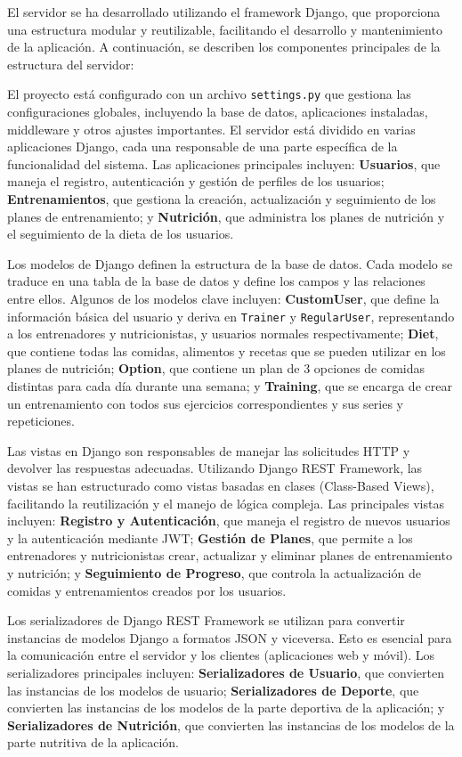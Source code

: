 El servidor se ha desarrollado utilizando el framework Django, que proporciona una estructura modular y reutilizable, facilitando el desarrollo y mantenimiento de la aplicación. A continuación, se describen los componentes principales de la estructura del servidor:

El proyecto está configurado con un archivo \texttt{settings.py} que gestiona las configuraciones globales, incluyendo la base de datos, aplicaciones instaladas, middleware y otros ajustes importantes. El servidor está dividido en varias aplicaciones Django, cada una responsable de una parte específica de la funcionalidad del sistema. Las aplicaciones principales incluyen: \textbf{Usuarios}, que maneja el registro, autenticación y gestión de perfiles de los usuarios; \textbf{Entrenamientos}, que gestiona la creación, actualización y seguimiento de los planes de entrenamiento; y \textbf{Nutrición}, que administra los planes de nutrición y el seguimiento de la dieta de los usuarios.

Los modelos de Django definen la estructura de la base de datos. Cada modelo se traduce en una tabla de la base de datos y define los campos y las relaciones entre ellos. Algunos de los modelos clave incluyen: \textbf{CustomUser}, que define la información básica del usuario y deriva en \texttt{Trainer} y \texttt{RegularUser}, representando a los entrenadores y nutricionistas, y usuarios normales respectivamente; \textbf{Diet}, que contiene todas las comidas, alimentos y recetas que se pueden utilizar en los planes de nutrición; \textbf{Option}, que contiene un plan de 3 opciones de comidas distintas para cada día durante una semana; y \textbf{Training}, que se encarga de crear un entrenamiento con todos sus ejercicios correspondientes y sus series y repeticiones.

Las vistas en Django son responsables de manejar las solicitudes HTTP y devolver las respuestas adecuadas. Utilizando Django REST Framework, las vistas se han estructurado como vistas basadas en clases (Class-Based Views), facilitando la reutilización y el manejo de lógica compleja. Las principales vistas incluyen: \textbf{Registro y Autenticación}, que maneja el registro de nuevos usuarios y la autenticación mediante JWT; \textbf{Gestión de Planes}, que permite a los entrenadores y nutricionistas crear, actualizar y eliminar planes de entrenamiento y nutrición; y \textbf{Seguimiento de Progreso}, que controla la actualización de comidas y entrenamientos creados por los usuarios.

Los serializadores de Django REST Framework se utilizan para convertir instancias de modelos Django a formatos JSON y viceversa. Esto es esencial para la comunicación entre el servidor y los clientes (aplicaciones web y móvil). Los serializadores principales incluyen: \textbf{Serializadores de Usuario}, que convierten las instancias de los modelos de usuario; \textbf{Serializadores de Deporte}, que convierten las instancias de los modelos de la parte deportiva de la aplicación; y \textbf{Serializadores de Nutrición}, que convierten las instancias de los modelos de la parte nutritiva de la aplicación.

